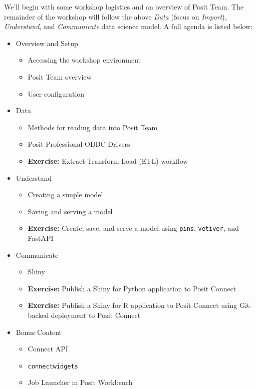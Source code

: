 \documentclass[
  letterpaper,
  DIV=11,
  numbers=noendperiod]{scrreprt}
\begin{document}
We'll begin with some workshop logistics and an overview of Posit Team.
The remainder of the workshop will follow the above \emph{Data} (focus
on \emph{Import}), \emph{Understand}, and \emph{Communicate} data
science model. A full agenda is listed below:

\begin{itemize}
\item
  Overview and Setup

  \begin{itemize}
  \item
    Accessing the workshop environment
  \item
    Posit Team overview
  \item
    User configuration
  \end{itemize}
\item
  Data

  \begin{itemize}
  \item
    Methods for reading data into Posit Team
  \item
    Posit Professional ODBC Drivers
  \item
    \textbf{Exercise:} Extract-Transform-Load (ETL) workflow
  \end{itemize}
\item
  Understand

  \begin{itemize}
  \item
    Creating a simple model
  \item
    Saving and serving a model
  \item
    \textbf{Exercise:} Create, save, and serve a model using
    \texttt{pins}, \texttt{vetiver}, and FastAPI
  \end{itemize}
\item
  Communicate

  \begin{itemize}
  \item
    Shiny
  \item
    \textbf{Exercise:} Publish a Shiny for Python application to Posit
    Connect
  \item
    \textbf{Exercise:} Publish a Shiny for R application to Posit
    Connect using Git-backed deployment to Posit Connect
  \end{itemize}
\item
  Bonus Content

  \begin{itemize}
  \item
    Connect API
  \item
    \texttt{connectwidgets}
  \item
    Job Launcher in Posit Workbench
  \end{itemize}
\end{itemize}
\end{document}
